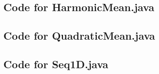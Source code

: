 \documentclass[12pt,fleqn]{examtst}
\begin{document}
\noindent 

\newpage

\subsection*{Code for HarmonicMean.java}

\noindent 

\newpage

\subsection*{Code for QuadraticMean.java}

\noindent 

\newpage

\subsection*{Code for Seq1D.java}

\noindent 

\end{document}
